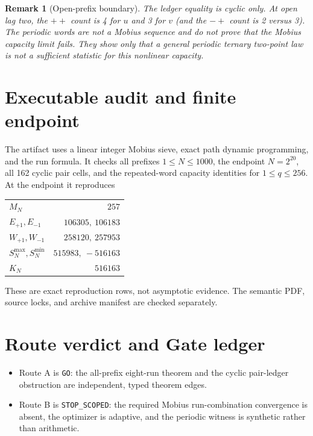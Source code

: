 \documentclass[11pt]{article}
\newtheorem{remark}[theorem]{Remark}
\begin{document}
\begin{remark}[Open-prefix boundary]
The ledger equality is cyclic only.  At open lag two, the $++$ count is 4
for $u$ and 3 for $v$ (and the $-+$ count is 2 versus 3).  The periodic
words are not a Mobius sequence and do not prove that the Mobius capacity
limit fails.  They show only that a general periodic ternary two-point law is
not a sufficient statistic for this nonlinear capacity.
\end{remark}

\section{Executable audit and finite endpoint}

The artifact uses a linear integer Mobius sieve, exact path dynamic
programming, and the run formula.  It checks all prefixes $1\leq N\leq1000$,
the endpoint $N=2^{20}$, all 162 cyclic pair cells, and the repeated-word
capacity identities for $1\leq q\leq256$.  At the endpoint it reproduces
\begin{center}
\begin{tabular}{@{}lr@{}}
\toprule
$M_N$ & $257$\\
$E_{+1},E_{-1}$ & $106305,\ 106183$\\
$W_{+1},W_{-1}$ & $258120,\ 257953$\\
$S_N^{\max},S_N^{\min}$ & $515983,\ -516163$\\
$K_N$ & $516163$\\
\bottomrule
\end{tabular}
\end{center}
These are exact reproduction rows, not asymptotic evidence.  The semantic
PDF, source locks, and archive manifest are checked separately.

\section{Route verdict and Gate ledger}

\begin{itemize}[leftmargin=*]
\item Route A is \texttt{GO}: the all-prefix eight-run theorem and the
  cyclic pair-ledger obstruction are independent, typed theorem edges.
\item Route B is \texttt{STOP\_SCOPED}: the required Mobius run-combination
  convergence is absent, the optimizer is adaptive, and the periodic witness
  is synthetic rather than arithmetic.
\end{itemize}
\end{document}
